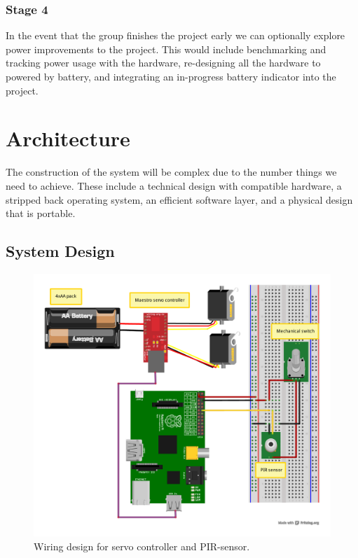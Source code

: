 \documentclass[11pt,a4paper,titlepage]{report}
\begin{document}
\subsubsection{Stage 4}

In the event that the group finishes the project early we can optionally explore power improvements to the project. This would include benchmarking and tracking power usage with the hardware, re-designing all the hardware to powered by battery, and integrating an in-progress battery indicator into the project.



\section{Architecture}

The construction of the system will be complex due to the number things we need to achieve. These include a technical design with compatible hardware, a stripped back operating system, an efficient software layer, and a physical design that is portable.

\subsection{System Design}

\begin{figure}
\centering
\includegraphics[width=1.0\textwidth]{graphs/init_bb.pdf}
\caption{Wiring design for servo controller and PIR-sensor.}
\label{fig:initbb}
\end{figure}
\end{document}
